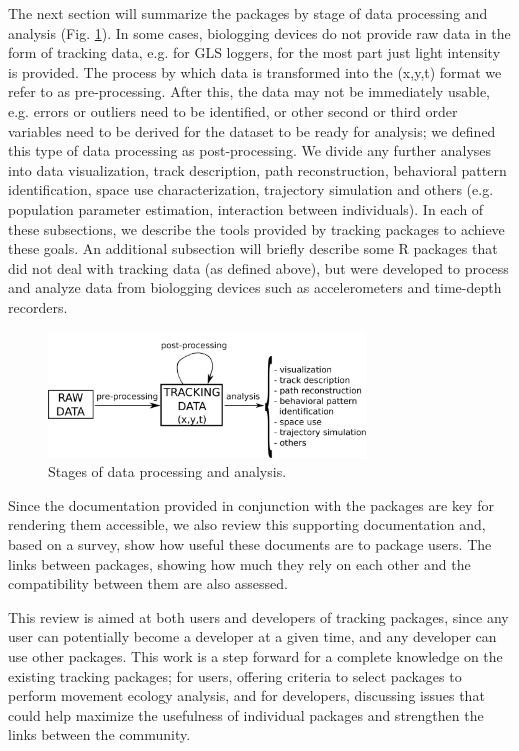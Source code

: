 \documentclass[a4paper,12pt]{article}
\begin{document}
The next section will summarize the packages by stage of data processing and analysis (Fig. \ref{fig:DataProcess}). In some cases, biologging devices do not provide raw data in the form of tracking data, e.g. for GLS loggers, for the most part just light intensity is provided. The process by which data is transformed into the (x,y,t) format we refer to as pre-processing. After this, the data may not be immediately usable, e.g. errors or outliers need to be identified, or other second or third order variables need to be derived for the dataset to be ready for analysis; we defined this type of data processing as post-processing. We divide any further analyses into data visualization, track description, path reconstruction, behavioral pattern identification, space use characterization, trajectory simulation and others (e.g. population parameter estimation, interaction between individuals). In each of these subsections, we describe the tools provided by tracking packages to achieve these goals. An additional subsection will briefly describe some R packages that did not deal with tracking data (as defined above), but were developed to process and analyze data from biologging devices such as accelerometers and time-depth recorders. 

\begin{figure}
	\centering
	\includegraphics[width=0.75\textwidth]{./mes_images/process-sketch-3.pdf}
	\caption{\label{fig:DataProcess} Stages of data processing and analysis.}
\end{figure} 

Since the documentation provided in conjunction with the packages are key for rendering them accessible, we also review this supporting documentation and, based on a survey, show how useful these documents are to package users. The links between packages, showing how much they rely on each other and the compatibility between them are also assessed. 

This review is aimed at both users and developers of tracking packages, since any user can potentially become a developer at a given time, and any developer can use other packages. This work is a step forward for a complete knowledge on the existing tracking packages; for users, offering criteria to select packages to perform movement ecology analysis, and for developers, discussing issues that could help maximize the usefulness of individual packages and strengthen the links between the community. 
\end{document}
